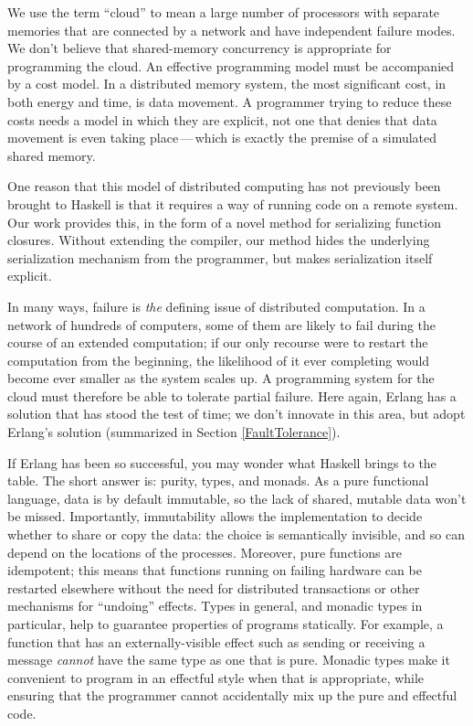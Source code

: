 \documentclass{sigplanconf}
\begin{document}
We use the term ``cloud'' to mean a large number of processors with separate memories that are connected by a network and have independent failure modes.
We don't believe that shared-memory concurrency is appropriate for programming the cloud.
An effective programming model must be accompanied by a cost model.
In a distributed memory system, the most significant cost, in both energy and time, is data movement.
A programmer trying to reduce these costs needs a model in which they are explicit, not one that denies that data movement is even taking place\,---\,which is exactly the premise of a simulated shared memory. 


One reason that this model of distributed computing has not previously been brought to Haskell is that it requires a way of running code on a remote system. 
Our work provides this, in the form of a novel method for serializing function closures.
Without extending the compiler, our method hides the underlying serialization mechanism from the programmer, but makes serialization itself explicit.

In many ways, failure is \emph{the} defining issue of distributed computation.  
In a network of hundreds of computers, some of them are likely to fail during the course of an extended computation; if our only recourse were to restart the computation from the beginning, the likelihood of it ever completing would become ever smaller as the system scales up.  
A programming system for the cloud must therefore be able to tolerate partial failure.  Here again, Erlang has a solution that has stood the test of time; 
we don't innovate in this area, but adopt Erlang's solution (summarized in Section \ref{FaultTolerance}).

If Erlang has been so successful, you may wonder what Haskell brings to the table. 
The short answer is: purity, types, and monads. 
As a pure functional language, data is by default immutable, so the lack of shared, mutable data won't be missed. 
Importantly, immutability allows the implementation to decide whether to share or copy the data: the choice is semantically invisible, and so can depend on the locations of the processes. 
Moreover, pure functions are idempotent; this means that functions running on failing hardware can be restarted elsewhere without the need for distributed transactions or other mechanisms for ``undoing'' effects.  
Types in general, and monadic types in particular, help to guarantee properties of programs statically.  
For example, a function that has an externally-visible effect such as sending or receiving a message \emph{cannot} have the same type as one that is pure.
Monadic types make it convenient to program in an effectful style when that is appropriate, while ensuring that the programmer cannot accidentally mix up the pure and effectful code.
\end{document}
